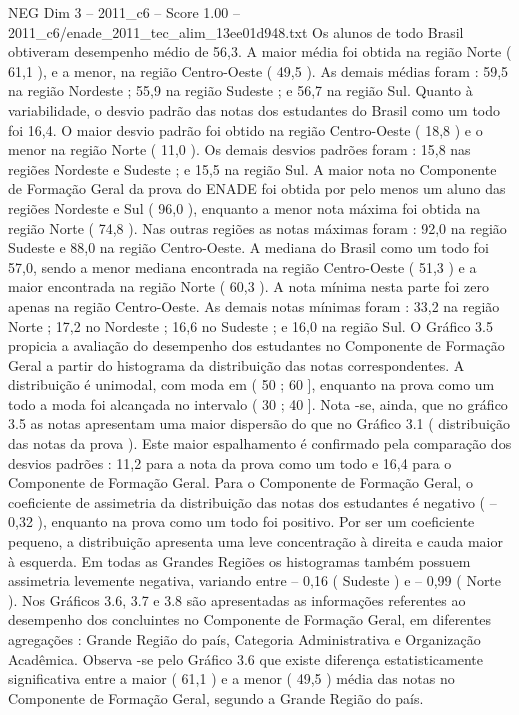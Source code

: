 \begin{textsample}{NEG Dim 3 – 2011\_c6 – Score 1.00 – 2011\_c6/enade\_2011\_tec\_alim\_13ee01d948.txt}
Os alunos de todo Brasil obtiveram desempenho médio de 56,3.
A maior média foi obtida na região Norte ( 61,1 ), e a menor, na região Centro-Oeste ( 49,5 ).
As demais médias foram : 59,5 na região Nordeste ; 55,9 na região Sudeste ; e 56,7 na região Sul.
Quanto à variabilidade, o desvio padrão das notas dos estudantes do Brasil como um todo foi 16,4.
O maior desvio padrão foi obtido na região Centro-Oeste ( 18,8 ) e o menor na região Norte ( 11,0 ).
Os demais desvios padrões foram : 15,8 nas regiões Nordeste e Sudeste ; e 15,5 na região Sul.
A maior nota no Componente de Formação Geral da prova do ENADE foi obtida por pelo menos um aluno das regiões Nordeste e Sul ( 96,0 ), enquanto a menor nota máxima foi obtida na região Norte ( 74,8 ).
Nas outras regiões as notas máximas foram : 92,0 na região Sudeste e 88,0 na região Centro-Oeste.
A mediana do Brasil como um todo foi 57,0, sendo a menor mediana encontrada na região Centro-Oeste ( 51,3 ) e a maior encontrada na região Norte ( 60,3 ).
A nota mínima nesta parte foi zero apenas na região Centro-Oeste.
As demais notas mínimas foram : 33,2 na região Norte ; 17,2 no Nordeste ; 16,6 no Sudeste ; e 16,0 na região Sul.
O Gráfico 3.5 propicia a avaliação do desempenho dos estudantes no Componente de Formação Geral a partir do histograma da distribuição das notas correspondentes.
A distribuição é unimodal, com moda em ( 50 ; 60 ], enquanto na prova como um todo a moda foi alcançada no intervalo ( 30 ; 40 ].
Nota -se, ainda, que no gráfico 3.5 as notas apresentam uma maior dispersão do que no Gráfico 3.1 ( distribuição das notas da prova ).
Este maior espalhamento é confirmado pela comparação dos desvios padrões : 11,2 para a nota da prova como um todo e 16,4 para o Componente de Formação Geral.
Para o Componente de Formação Geral, o coeficiente de assimetria da distribuição das notas dos estudantes é negativo ( – 0,32 ), enquanto na prova como um todo foi positivo.
Por ser um coeficiente pequeno, a distribuição apresenta uma leve concentração à direita e cauda maior à esquerda.
Em todas as Grandes Regiões os histogramas também possuem assimetria levemente negativa, variando entre – 0,16 ( Sudeste ) e – 0,99 ( Norte ).
Nos Gráficos 3.6, 3.7 e 3.8 são apresentadas as informações referentes ao desempenho dos concluintes no Componente de Formação Geral, em diferentes agregações : Grande Região do país, Categoria Administrativa e Organização Acadêmica.
Observa -se pelo Gráfico 3.6 que existe diferença estatisticamente significativa entre a maior ( 61,1 ) e a menor ( 49,5 ) média das notas no Componente de Formação Geral, segundo a Grande Região do país.

\end{textsample}
